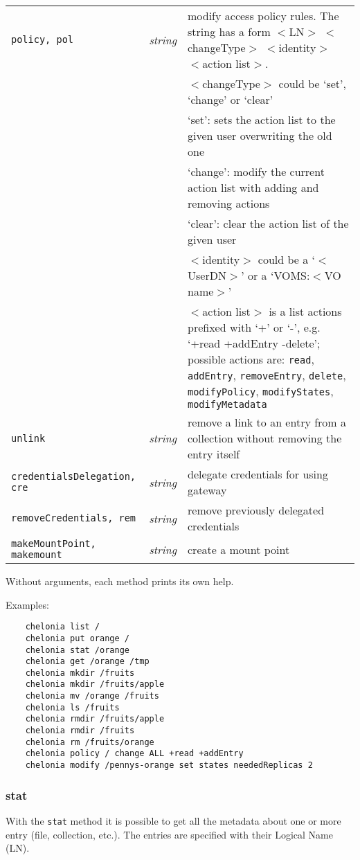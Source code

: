 \begin{longtable}{llp{8cm}}
   \texttt{policy, pol} &\textit{string}& modify access policy rules. The string has a form $<$LN$>$ $<$changeType$>$ $<$identity$>$ $<$action list$>$.\\
   & &$<$changeType$>$ could be `set', `change' or `clear'\\
   & & `set': sets the action list to the given user overwriting the old one\\
   & & `change': modify the current action list with adding and removing actions\\
   & & `clear': clear the action list of the given user\\
   & &$<$identity$>$ could be a `$<$UserDN$>$' or a `VOMS:$<$VO name$>$'\\
   & &$<$action list$>$ is a list actions prefixed with `+' or `-', e.g. `+read +addEntry -delete'; possible actions are: \texttt{read}, \texttt{addEntry}, \texttt{removeEntry}, \texttt{delete}, \texttt{modifyPolicy}, \texttt{modifyStates}, \texttt{modifyMetadata}\\
   \texttt{unlink} &\textit{string}& remove a link to an entry from a collection without removing the entry itself\\
   \texttt{credentialsDelegation, cre} &\textit{string}& delegate credentials for using gateway\\
   \texttt{removeCredentials, rem} &\textit{string}& remove previously delegated credentials\\
   \texttt{makeMountPoint, makemount} &\textit{string}& create a mount point\\
\end{longtable}

Without arguments, each method prints its own help.

Examples:
\begin{verbatim}
    chelonia list /
    chelonia put orange /
    chelonia stat /orange
    chelonia get /orange /tmp
    chelonia mkdir /fruits
    chelonia mkdir /fruits/apple
    chelonia mv /orange /fruits
    chelonia ls /fruits
    chelonia rmdir /fruits/apple
    chelonia rmdir /fruits
    chelonia rm /fruits/orange
    chelonia policy / change ALL +read +addEntry
    chelonia modify /pennys-orange set states neededReplicas 2
\end{verbatim}

\subsubsection{stat} %
\label{ssub:stat}
With the \texttt{stat} method it is possible to get all the metadata about one or more entry (file, collection, etc.). The entries are specified with their Logical Name (LN).
\hspace*{0.5cm}
\begin{shaded}
\end{shaded}


